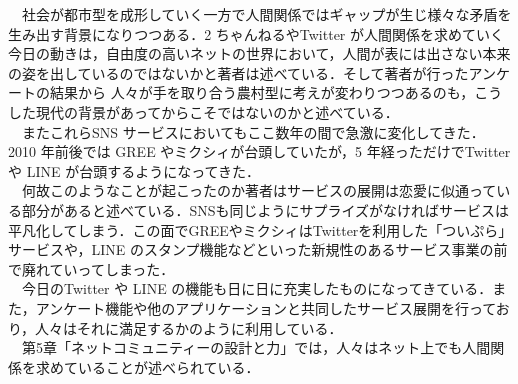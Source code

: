 \documentclass[uplatex,twocolumn,dvipdfmx]{jsarticle}
\begin{document}
　社会が都市型を成形していく一方で人間関係ではギャップが生じ様々な矛盾を生み出す背景になりつつある．2 ちゃんねるやTwitter が人間関係を求めていく今日の動きは，自由度の高いネットの世界において，人間が表には出さない本来の姿を出しているのではないかと著者は述べている．そして著者が行ったアンケートの結果から 人々が手を取り合う農村型に考えが変わりつつあるのも，こうした現代の背景があってからこそではないのかと述べている．\\
　またこれらSNS サービスにおいてもここ数年の間で急激に変化してきた．2010 年前後では GREE やミクシィが台頭していたが，5 年経っただけでTwitterや LINE が台頭するようになってきた．\\
　何故このようなことが起こったのか著者はサービスの展開は恋愛に似通っている部分があると述べている．SNSも同じようにサプライズがなければサービスは平凡化してしまう．この面でGREEやミクシィはTwitterを利用した「ついぷら」サービスや，LINE のスタンプ機能などといった新規性のあるサービス事業の前で廃れていってしまった．\\
　今日のTwitter や LINE の機能も日に日に充実したものになってきている．また，アンケート機能や他のアプリケーションと共同したサービス展開を行っており，人々はそれに満足するかのように利用している．\\
　第5章「ネットコミュニティーの設計と力」では，人々はネット上でも人間関係を求めていることが述べられている．
\end{document}
